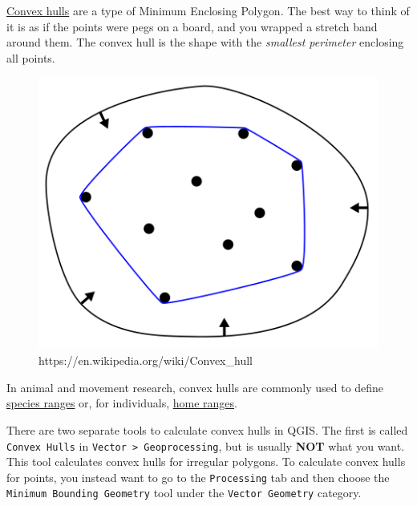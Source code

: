 \documentclass[
  letterpaper,
  DIV=11,
  numbers=noendperiod]{scrreprt}
\begin{document}
\href{https://en.wikipedia.org/wiki/Convex_hul}{Convex hulls} are a type
of Minimum Enclosing Polygon. The best way to think of it is as if the
points were pegs on a board, and you wrapped a stretch band around them.
The convex hull is the shape with the \emph{smallest perimeter}
enclosing all points.

\begin{figure}[H]

{\centering \includegraphics{index_files/mediabag/440px-ConvexHull.svg.png}

}

\caption{https://en.wikipedia.org/wiki/Convex\_hull}

\end{figure}%

In animal and movement research, convex hulls are commonly used to
define \href{https://en.wikipedia.org/wiki/Species_distribution}{species
ranges} or, for individuals,
\href{https://en.wikipedia.org/wiki/Home_range}{home ranges}.

\begin{tcolorbox}[enhanced jigsaw, coltitle=black, toprule=.15mm, breakable, opacitybacktitle=0.6, left=2mm, colback=white, leftrule=.75mm, rightrule=.15mm, colbacktitle=quarto-callout-important-color!10!white, toptitle=1mm, titlerule=0mm, colframe=quarto-callout-important-color-frame, arc=.35mm, bottomtitle=1mm, opacityback=0, bottomrule=.15mm, title=\textcolor{quarto-callout-important-color}{\faExclamation}\hspace{0.5em}{Important}]

There are two separate tools to calculate convex hulls in QGIS. The
first is called \texttt{Convex\ Hulls} in
\texttt{Vector\ \textgreater{}\ Geoprocessing}, but is usually
\textbf{NOT} what you want. This tool calculates convex hulls for
irregular polygons. To calculate convex hulls for points, you instead
want to go to the \texttt{Processing} tab and then choose the
\texttt{Minimum\ Bounding\ Geometry} tool under the
\texttt{Vector\ Geometry} category.

\end{tcolorbox}
\end{document}
